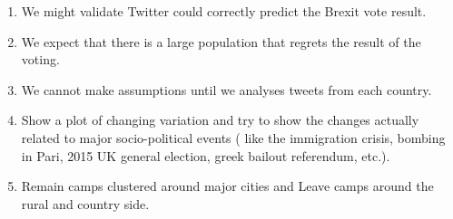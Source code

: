 \documentclass{article}
\begin{document}
\begin{enumerate}
\item We might validate Twitter could correctly predict the Brexit vote result.
\item We expect that there is a large population that regrets the result of the voting.
\item We cannot make assumptions until we analyses tweets from each country.
\item Show a plot of changing variation and try to show the changes actually related to major socio-political events ( like the immigration crisis, bombing in Pari, 2015 UK general election, greek bailout referendum, etc.).
\item Remain camps clustered around major cities and Leave camps around the rural and country side.

\end{enumerate}
\end{document}
